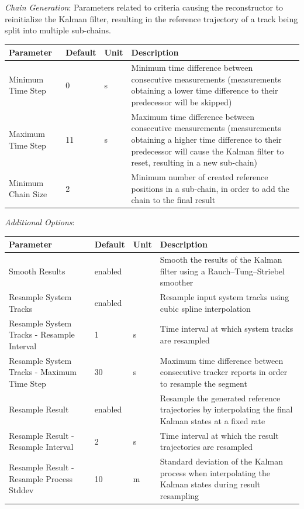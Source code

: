 \textit{Chain Generation}: Parameters related to criteria causing the reconstructor to reinitialize the Kalman filter, 
resulting in the reference trajectory of a track being split into multiple sub-chains.
\begin{table}[H]
    \center
    \begin{tabularx}{\textwidth}{ | l | l | l | X |}
        \hline
        \textbf{Parameter} & \textbf{Default} & \textbf{Unit} & \textbf{Description} \\ \hline
        Minimum Time Step & 0 & s & Minimum time difference between consecutive measurements (measurements obtaining a 
            lower time difference to their predecessor will be skipped) \\ \hline
        Maximum Time Step & 11 & s & Maximum time difference between consecutive measurements (measurements obtaining a 
            higher time difference to their predecessor will cause the Kalman filter to reset, 
            resulting in a new sub-chain) \\ \hline
        Minimum Chain Size & 2 & & Minimum number of created reference positions in a sub-chain, in order to add the chain 
            to the final result \\ \hline
    \end{tabularx}
\end{table}

\textit{Additional Options}:
\begin{table}[H]
    \center
    \begin{tabularx}{\textwidth}{ | X | l | l | X |}
        \hline
        \textbf{Parameter} & \textbf{Default} & \textbf{Unit} & \textbf{Description} \\ \hline
        Smooth Results & enabled & & Smooth the results of the Kalman filter using a Rauch–Tung–Striebel smoother \\ \hline
        Resample System Tracks & enabled & & Resample input system tracks using cubic spline interpolation \\ \hline
        Resample System Tracks - Resample Interval & 1 & s & Time interval at which system tracks are resampled \\ \hline
        Resample System Tracks - Maximum Time Step & 30 & s & Maximum time difference between consecutive tracker 
            reports in order to resample the segment \\ \hline
        Resample Result & enabled & & Resample the generated reference trajectories by interpolating the final Kalman states
            at a fixed rate \\ \hline
        Resample Result - Resample Interval & 2 & s & Time interval at which the result trajectories are resampled \\ \hline
        Resample Result - Resample Process Stddev & 10 & m & Standard deviation of the Kalman process when interpolating the 
            Kalman states during result resampling \\ \hline
    \end{tabularx}
\end{table}

